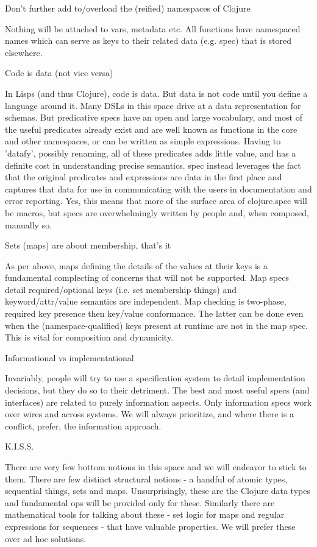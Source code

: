 Don’t further add to/overload the (reified) namespaces of Clojure

Nothing will be attached to vars, metadata etc. All functions have namespaced names which can serve as keys to their related data (e.g. spec) that is stored elsewhere.

Code is data (not vice versa)

In Lisps (and thus Clojure), code is data. But data is not code until you define a language around it. Many DSLs in this space drive at a data representation for schemas. But predicative specs have an open and large vocabulary, and most of the useful predicates already exist and are well known as functions in the core and other namespaces, or can be written as simple expressions. Having to 'datafy', possibly renaming, all of these predicates adds little value, and has a definite cost in understanding precise semantics. spec instead leverages the fact that the original predicates and expressions are data in the first place and captures that data for use in communicating with the users in documentation and error reporting. Yes, this means that more of the surface area of clojure.spec will be macros, but specs are overwhelmingly written by people and, when composed, manually so.

Sets (maps) are about membership, that’s it

As per above, maps defining the details of the values at their keys is a fundamental complecting of concerns that will not be supported. Map specs detail required/optional keys (i.e. set membership things) and keyword/attr/value semantics are independent. Map checking is two-phase, required key presence then key/value conformance. The latter can be done even when the (namespace-qualified) keys present at runtime are not in the map spec. This is vital for composition and dynamicity.

Informational vs implementational

Invariably, people will try to use a specification system to detail implementation decisions, but they do so to their detriment. The best and most useful specs (and interfaces) are related to purely information aspects. Only information specs work over wires and across systems. We will always prioritize, and where there is a conflict, prefer, the information approach.

K.I.S.S.

There are very few bottom notions in this space and we will endeavor to stick to them. There are few distinct structural notions - a handful of atomic types, sequential things, sets and maps. Unsurprisingly, these are the Clojure data types and fundamental ops will be provided only for these. Similarly there are mathematical tools for talking about these - set logic for maps and regular expressions for sequences - that have valuable properties. We will prefer these over ad hoc solutions.

